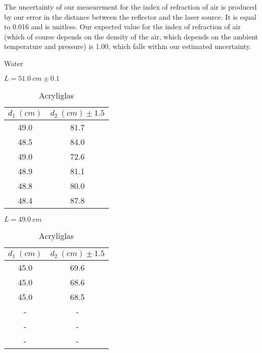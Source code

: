 \documentclass{amsart}
\begin{document}
The uncertainty of our measurement for the index of refraction of air is produced by our error in the distance between the reflector and the laser source. It is equal to 0.016 and is unitless. Our expected value for the index of refraction of air (which of course depends on the density of the air, which depends on the ambient temperature and pressure) is 1.00, which falls within our estimated uncertainty.

\begin{table}[H]
    \begin{minipage}{0.3\textwidth}
        \centering
        \caption{Water}
        \vspace{-0.2cm}
        $L = 51.0\ \unit{cm} \pm 0.1$
        \vspace{0.3cm}
        \label{my-label}
        \begin{tabular}{c|c}
        $d_1 \unit{\ (cm)}$ & $d_2 \unit{\ (cm)} \pm 1.5$ \\ \hline
        49.0            & 81.7                    \\
        48.5            & 84.0                    \\
        49.0            & 72.6                    \\
        48.9            & 81.1                    \\
        48.8            & 80.0                    \\
        48.4            & 87.8
        \end{tabular}
    \end{minipage}
    \begin{minipage}{0.3\textwidth}
        \centering
        \caption{Acryliglas}
        \vspace{-0.2cm}
        $L = 49.0 \ \unit{cm}$
        \vspace{0.3cm}
        \label{my-label}
        \begin{tabular}{c|c}
        $d_1 \unit{\ (cm)}$        & $d_2 \unit{\ (cm)} \pm 1.5$ \\ \hline
        45.0                   & 69.6                    \\
        45.0                   & 68.6                    \\
        45.0                   & 68.5                    \\
        - & - \\
        - & - \\
        - & - \\
        \end{tabular}

\end{minipage}
\end{table}
\end{document}
